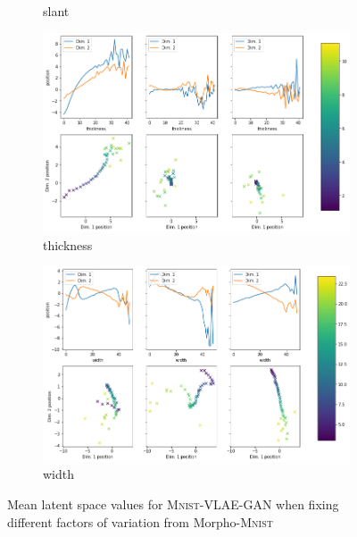 \begin{figure}[H]
\begin{subfigure}{.48\textwidth}
        \caption{slant}
    \end{subfigure}
    \hfill
    \begin{subfigure}{.48\textwidth}
        \includegraphics[width=\textwidth]{images/latent_space_traversals/vlae_gan_mnist_morpho_latent_space_values_thickness.png}
        \caption{thickness}
    \end{subfigure}
    \begin{subfigure}{.48\textwidth}
        \includegraphics[width=\textwidth]{images/latent_space_traversals/vlae_gan_mnist_morpho_latent_space_values_width.png}
        \caption{width}
    \end{subfigure}
    \caption[\textsc{Mnist}-VLAE-GAN - Latent Space Values]{Mean latent space values for \textsc{Mnist}-VLAE-GAN when fixing different factors of variation from Morpho-\textsc{Mnist}}
    \label{fig:appendix_vlae_gan_mnist_latent_space_morpho}

\end{figure}

